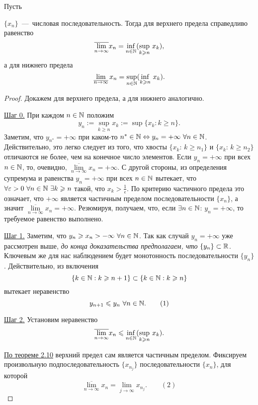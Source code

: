 \begin{theorem}
    \hypertarget{thm2.11}{Пусть} $\{ x_{n} \}$~---~числовая последовательность. Тогда для верхнего предела справедливо равенство
    $$ \overline{\lim\limits_{n\to \infty}} x_{n} = \underset{n \in \mathbb{N}}{\inf} ({\sup\limits_{k \geqslant n}} \  x_{k}),$$
    а для нижнего предела
    $$ \lim\limits_{\overline{n\to \infty}} x_{n} = \underset{n \in \mathbb{N}}{\sup} ({\inf\limits_{k\geqslant n}} \  x_{k}).$$
\end{theorem}
\begin{proof}
    Докажем для верхнего предела, а для нижнего аналогично. 

    \underline{Шаг 0.} При каждом $n \in \mathbb{N}$ положим
    $$ y_{n} := \sup\limits_{k \geq n} x_{k} := \sup \{ x_{k}: k \geq n\}.$$
    Заметим, что $y_{n^{*}} = + \infty$ при каком-то $n^{*} \in \mathbb{N} \Leftrightarrow y_{n} = + \infty \  \forall n \in \mathbb{N}$. Действительно, это легко следует из того, что хвосты $\{ x_{k}$: $k \geq n_{1}\}$ и $\{ x_{k}$: $k \geq n_{2}\}$ отличаются не более, чем на конечное число элементов. Если $y_{n} = + \infty$ при всех $n \in \mathbb{N}$, то, очевидно, $\overline{\lim\limits_{n\to \infty}} x_{n} = + \infty.$ С другой стороны, из определения супремума и равенства $y_{n} = + \infty$ при всех $n \in \mathbb{N}$ вытекает, что $\forall \varepsilon > 0 \  \forall n \in \mathbb{N} \  \exists k \geqslant n$ такой, что $x_{k} > \frac{1}{\epsilon}$. По критерию частичного предела это означает, что $+\infty$ является частичным пределом последовательности $\{ x_{n} \}$, а значит $\overline{\lim\limits_{n\to \infty}} x_{n} = + \infty.$ Резюмируя, получаем, что, если $\exists n \in \mathbb{N}$: $y_{n} = + \infty$, то требуемое равенство выполнено.

    \underline{Шаг 1.} Заметим, что $y_{n} \geqslant x_{n} > -\infty \  \forall n \in \mathbb{N}$. Так как случай $y_{n} = +\infty$ уже рассмотрен выше, \textit{до конца доказательства предполагаем, что} $\{ y_{n} \} \subset \mathbb{R}$. Ключевым же для нас наблюдением будет монотонность последовательности $\{ y_{n} \}$. Действительно, из включения
    $$ \{ k \in \mathbb{N}: k \geqslant n + 1 \} \subset \{ k \in \mathbb{N}: k \geqslant n \}$$
    вытекает неравенство
    $$ y_{n + 1} \leqslant y_{n} \  \forall n \in \mathbb{N}. \qquad (1)$$

    \underline{\hypertarget{step2}{Шаг 2.}} Установим неравенство
    $$ \overline{\lim\limits_{n\to \infty}} x_{n} \leqslant \underset{n \in \mathbb{N}}{\inf} ({\sup\limits_{k \geqslant n}} \  x_{k}).$$

    \hyperlink{thm2.10}{По теореме 2.10} верхний предел сам является частичным пределом. Фиксируем произвольную подпоследовательность $\{ x_{n_{j}} \}$ последовательности $\{ x_{n} \}$, для которой
    $$ \overline{\lim\limits_{n\to \infty}} x_{n} = \lim\limits_{j\to \infty} x_{n_{j}}. \qquad (2)$$


\end{proof}
